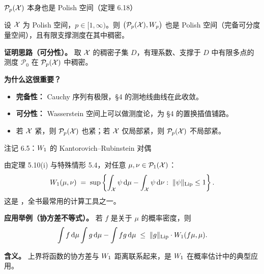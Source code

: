\begin{frame}{$\mathcal{P}_{p}(\mathcal{X})$ 本身也是 Polish 空间（定理 6.18）}

  设 $\mathcal{X}$ 为 Polish 空间，$p\in[1,\infty)$。则 $\bigl(\mathcal{P}_{p}(\mathcal{X}),W_{p}\bigr)$ 也是 Polish 空间（完备可分度量空间），且有限支撑测度在其中稠密。

  \textbf{证明思路（可分性）。} 取 $\mathcal{X}$ 的稠密子集 $D$，有理系数、支撑于 $D$ 中有限多点的测度 $\mathcal{P}_{0}$ 在 $\mathcal{P}_{p}(\mathcal{X})$ 中稠密。

  \textbf{为什么这很重要？}
  \begin{itemize}
    \item \textbf{完备性：} Cauchy 序列有极限，§4 的测地线曲线在此收敛。
    \item \textbf{可分性：} Wasserstein 空间上可以做测度论，为 §4 的置换插值铺路。
    \item 若 $\mathcal{X}$ 紧，则 $\mathcal{P}_{p}(\mathcal{X})$ 也紧；若 $\mathcal{X}$ 仅局部紧，则 $\mathcal{P}_{p}(\mathcal{X})$ 不局部紧。
  \end{itemize}

\end{frame}

\begin{frame}{注记 6.5：$W_{1}$ 的 Kantorovich–Rubinstein 对偶}

  由定理 5.10(i) 与特殊情形 5.4，对任意 $\mu,\nu\in\mathcal{P}_{1}(\mathcal{X})$：
  \[
    W_{1}(\mu,\nu)
    \;=\; \sup\left\{\int_{\mathcal{X}}\psi\,\mathrm{d}\mu - \int_{\mathcal{X}}\psi\,\mathrm{d}\nu
          :\; \|\psi\|_{\mathrm{Lip}}\le1\right\}.
  \]
  这是 ，全书最常用的计算工具之一。

  \textbf{应用举例（协方差不等式）。} 若 $f$ 是关于 $\mu$ 的概率密度，则
  \[
    \int f\,\mathrm{d}\mu\int g\,\mathrm{d}\mu - \int fg\,\mathrm{d}\mu
    \;\le\; \|g\|_{\mathrm{Lip}}\cdot W_{1}(f\mu,\mu).
  \]

  \textbf{含义。} 上界将函数的协方差与 $W_{1}$ 距离联系起来，是 $W_{1}$ 在概率估计中的典型应用。

\end{frame}

